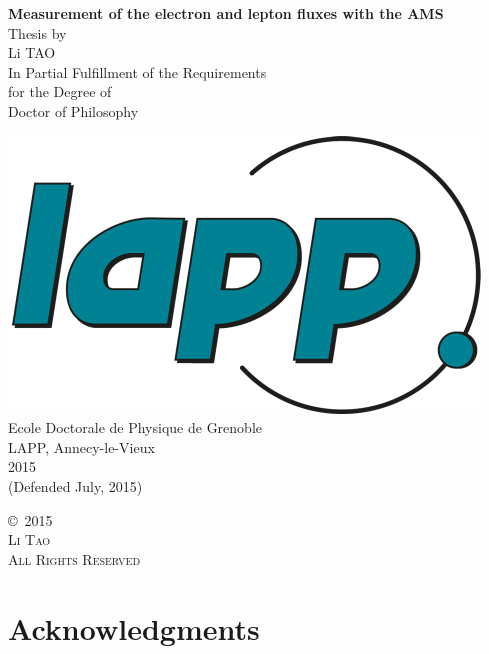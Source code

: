 \pagestyle{empty}

{\scshape 
\begin{center}
{\huge \bf
Measurement of the electron and lepton fluxes with the AMS\\
}
\vspace*{0.5in}
{\large Thesis by}\\[0.5em]
{\Large Li TAO} \\[1.5em]
{\large In Partial Fulfillment of the Requirements} \\[0.3em]
{\large for the Degree of} \\[0.3em]
{\large Doctor of Philosophy} \\[0.5em]


\vfill
\vfill

\mbox{\includegraphics[scale=0.4]{lapp_logo.pdf}}\\[0.6em]
{\Large Ecole Doctorale de Physique de Grenoble}\\[0.3em]
{\large LAPP, Annecy-le-Vieux} \\[1.6em]

{\Large 2015} \\[0.3em]
{\large (Defended July, 2015)}
\end{center}
}
\clearpage
% 
\mbox{}\vfill

\begin{center}
\scshape\large
\copyright\ 2015 \\[0.5em]
Li Tao\\[0.5em]
All Rights Reserved \\
\end{center}
\clearpage
\cleardoublepage
\chapter*{Acknowledgments}
%

\cleardoublepage
\pagestyle{plain}
\tableofcontents
\cleardoublepage
\pagestyle{fancy}
\fancyhead{}
\fancyhead[RO]{\rightmark}
\fancyhead[LE]{\leftmark}


